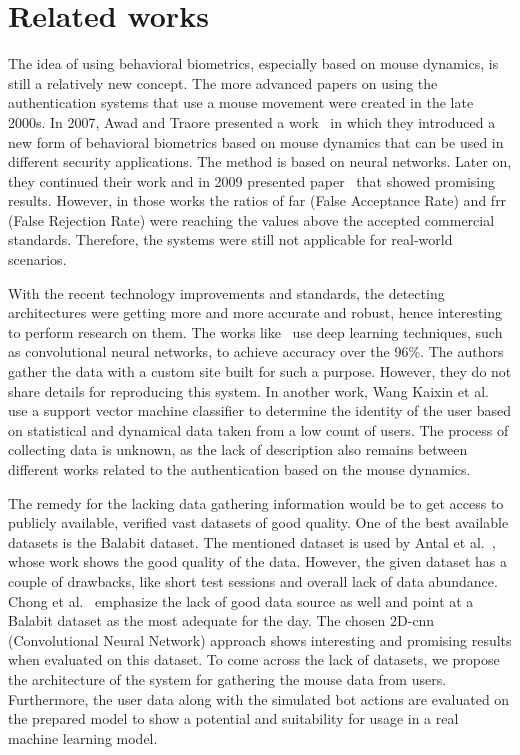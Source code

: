 \section{Related works}\label{sec:related-works}
The idea of using behavioral biometrics, especially based on mouse dynamics, is still a relatively new concept.
The more advanced papers on using the authentication systems that use a mouse movement were created in the late 2000s.
In 2007, Awad and Traore presented a work~\cite{firstMouseBBPapers1} in which they introduced a new form of behavioral biometrics based on mouse dynamics that can be used in different security applications.
The method is based on neural networks.
Later on, they continued their work and in 2009 presented paper~\cite{wang2009behavioral} that showed promising results.
However, in those works the ratios of \gls{far} (False Acceptance Rate) and \gls{frr} (False Rejection Rate) were reaching the values above the accepted commercial standards.
Therefore, the systems were still not applicable for real-world scenarios.

With the recent technology improvements and standards, the detecting architectures were getting more and more accurate and robust, hence interesting to perform research on them.
The works like~\cite{a-deep-learning-approach-to-web-bot-detection-using-mouse-behavioral-biometrics} use deep learning techniques, such as convolutional neural networks, to achieve accuracy over the 96\%.
The authors gather the data with a custom site built for such a purpose.
However, they do not share details for reproducing this system.
In another work, Wang Kaixin et al.~\cite{a-user-authentication-and-identification-model-based-on-mouse-dynamics} use a support vector machine classifier to determine the identity of the user based on statistical and dynamical data taken from a low count of users.
The process of collecting data is unknown, as the lack of description also remains between different works related to the authentication based on the mouse dynamics.

The remedy for the lacking data gathering information would be to get access to publicly available, verified vast datasets of good quality.
One of the best available datasets is the Balabit dataset.
The mentioned dataset is used by Antal et al.~\cite{antal2019intrusion}, whose work shows the good quality of the data.
However, the given dataset has a couple of drawbacks, like short test sessions and overall lack of data abundance.
Chong et al.~\cite{Main} emphasize the lack of good data source as well and point at a Balabit dataset as the most adequate for the day.
The chosen 2D-\gls{cnn} (Convolutional Neural Network) approach shows interesting and promising results when evaluated on this dataset.
To come across the lack of datasets, we propose the architecture of the system for gathering the mouse data from users.
Furthermore, the user data along with the simulated bot actions are evaluated on the prepared model to show a potential and suitability for usage in a real machine learning model.
